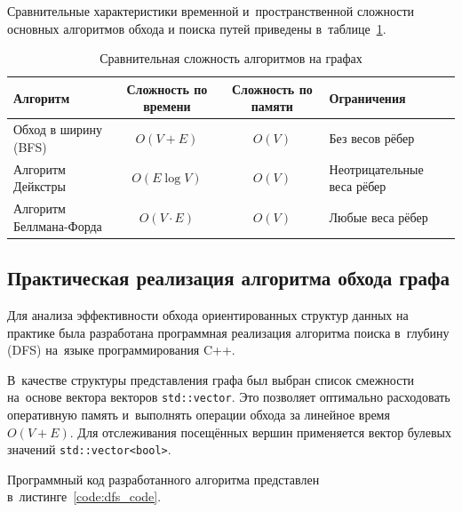 Сравнительные характеристики временной и~пространственной сложности основных алгоритмов обхода и поиска путей приведены в~таблице~\ref{tab:complexity}.

\begin{table}[htbp]
    \caption{Сравнительная сложность алгоритмов на графах}
    \label{tab:complexity}
    \begin{tabular}{|l|c|c|l|}
        \hline
        Алгоритм & Сложность по времени & Сложность по памяти & Ограничения \\
        \hline
        Обход в ширину (BFS) & $O(V + E)$ & $O(V)$ & Без весов рёбер \\
        Алгоритм Дейкстры & $O(E \log V)$ & $O(V)$ & Неотрицательные веса рёбер \\
        Алгоритм Беллмана-Форда & $O(V \cdot E)$ & $O(V)$ & Любые веса рёбер \\
        \hline
    \end{tabular}
\end{table}

\subsection{Практическая реализация алгоритма обхода графа}

Для анализа эффективности обхода ориентированных структур данных на практике была разработана программная реализация алгоритма поиска в~глубину (DFS) на~языке программирования C++.

В~качестве структуры представления графа был выбран список смежности на~основе вектора векторов \texttt{std::vector}. Это позволяет оптимально расходовать оперативную память и~выполнять операции обхода за линейное время $O(V + E)$. Для отслеживания посещённых вершин применяется вектор булевых значений \texttt{std::vector<bool>}.

Программный код разработанного алгоритма представлен в~листинге~\ref{code:dfs_code}.

\begin{listing}[htbp]
    \caption{Реализация алгоритма поиска в глубину (DFS) на C++}
    \label{code:dfs_code}
    \inputminted{text}{code.cpp}
\end{listing}
